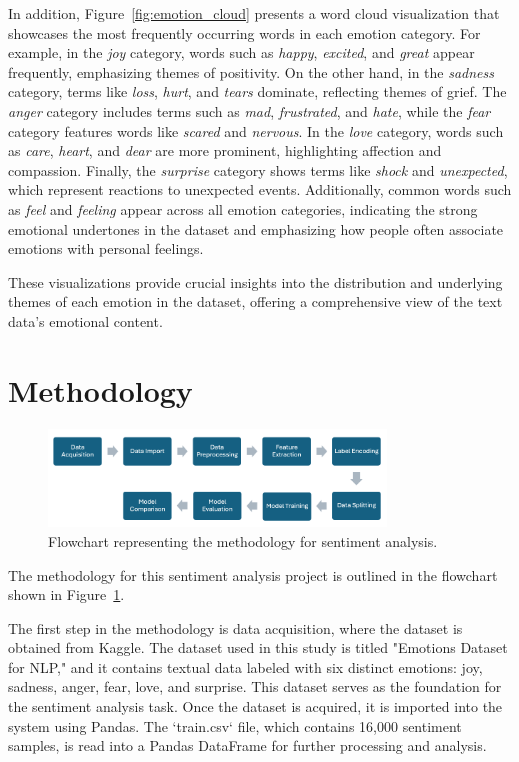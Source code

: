 In addition, Figure~\ref{fig:emotion_cloud} presents a word cloud visualization that showcases the most frequently occurring words in each emotion category. For example, in the \textit{joy} category, words such as \textit{happy}, \textit{excited}, and \textit{great} appear frequently, emphasizing themes of positivity. On the other hand, in the \textit{sadness} category, terms like \textit{loss}, \textit{hurt}, and \textit{tears} dominate, reflecting themes of grief. The \textit{anger} category includes terms such as \textit{mad}, \textit{frustrated}, and \textit{hate}, while the \textit{fear} category features words like \textit{scared} and \textit{nervous}. In the \textit{love} category, words such as \textit{care}, \textit{heart}, and \textit{dear} are more prominent, highlighting affection and compassion. Finally, the \textit{surprise} category shows terms like \textit{shock} and \textit{unexpected}, which represent reactions to unexpected events. Additionally, common words such as \textit{feel} and \textit{feeling} appear across all emotion categories, indicating the strong emotional undertones in the dataset and emphasizing how people often associate emotions with personal feelings.

These visualizations provide crucial insights into the distribution and underlying themes of each emotion in the dataset, offering a comprehensive view of the text data's emotional content.

\section{Methodology}

\begin{figure}[H]
    \centering
    \includegraphics[width=0.8\textwidth]{images/methodology_flow.png}
    \caption{Flowchart representing the methodology for sentiment analysis.}
    \label{fig:methodology_flow}
\end{figure}

The methodology for this sentiment analysis project is outlined in the flowchart shown in Figure~\ref{fig:methodology_flow}.

The first step in the methodology is data acquisition, where the dataset is obtained from Kaggle. The dataset used in this study is titled "Emotions Dataset for NLP," and it contains textual data labeled with six distinct emotions: joy, sadness, anger, fear, love, and surprise. This dataset serves as the foundation for the sentiment analysis task. Once the dataset is acquired, it is imported into the system using Pandas. The `train.csv` file, which contains 16,000 sentiment samples, is read into a Pandas DataFrame for further processing and analysis.

